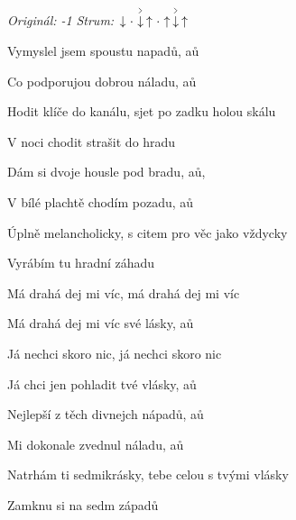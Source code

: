 \begin{song}


\begin{headerbox}
\RaiseBoxWithAccents
\textit{Originál: -1} \quad
\textit{Strum:} $\Down\Miss\AccentDown\Up\Miss\Up\AccentDown\Up$
\end{headerbox}

\begin{hchordbox}
\end{hchordbox}

\Large

\bigskip

Vymyslel jsem spoustu napadů, aů \par
Co podporujou dobrou náladu, aů \par
{}Hodit klíče do kanálu, sjet po zadku holou skálu \par
{}V noci chodit strašit do hradu \par

\bigskip

Dám si dvoje housle pod bradu, aů,  \par
{}V bílé plachtě chodím pozadu, aů \par
{}Úplně melancholicky, s citem pro věc jako vždycky \par
{}Vyrábím tu hradní záhadu  \par

\bigskip

\begin{chorusbox}{\Refren}
 Má drahá dej mi víc,  má drahá dej mi víc \par
{} Má drahá dej mi víc své lásky, aů \par
{} Já nechci skoro nic,  já nechci skoro nic \par
{} Já chci jen pohladit tvé vlásky, aů \par
\end{chorusbox}

\bigskip

Nejlepší z těch divnejch nápadů, aů \par
Mi dokonale zvednul náladu, aů \par
{}Natrhám ti sedmikrásky, tebe celou s tvými vlásky \par
{}Zamknu si na sedm západů  \par


\end{song}
